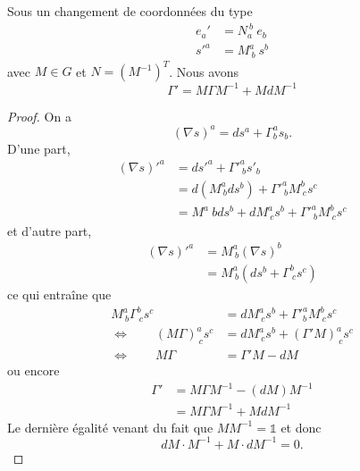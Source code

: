 \documentclass[a4paper,11pt]{report}
\begin{document}
            \begin{prop}\begin{leftbar}
                Sous un changement de coordonnées du type
                \begin{align}
                    e_a' &= N_a^{~b}~e_b \\
                    s'^a &= M^a_{~b} ~s^b
                \end{align}
                 avec $M\in G$ et $N = (M^{-1})^T$. Nous avons
                 \begin{equation}
                     \Gamma' = M\Gamma M^{-1} + MdM^{-1}
                 \end{equation}
            \end{leftbar}\end{prop}
        
            \begin{proof}
                On a 
                \begin{equation}
                    (\nabla s)^a = ds^a + \Gamma^a_b s_b.
                \end{equation}
                D'une part, 
                \begin{align}
                    (\nabla s)'^a &= ds'^a +  \Gamma'^a_{~b} s'_b \\
                    &= d(M^a_{~b} ds^b) + \Gamma'^a_{~b} M^b_{~c}s^c \\
                    &= M^a{~b}ds^b + dM^a_{~c}s^b + \Gamma'^a_{~b} M^b_{~c}s^c
                \end{align}
                et d'autre part,
                \begin{align}
                    (\nabla s)'^a &= M^a_{~b}(\nabla s)^b \\
                    &=  M^a_{~b}\left( ds^b+\Gamma^b_{~c}s^c \right)
                \end{align}
                ce qui entraîne que
                \begin{align}
                     M^a_{~b}\Gamma^b_{~c}s^c &=  dM^a_{~c}s^b + \Gamma'^a_b M^b_{~c}s^c\\
                     \Leftrightarrow \qquad (M\Gamma)^a_{~c}s^c &= dM^a_{~c}s^b + (\Gamma'M)^a_{~c}s^c\\ 
                     \Leftrightarrow \qquad M\Gamma &= \Gamma'M - dM
                \end{align}
                ou encore
                \begin{align}
                    \Gamma' &= M\Gamma M^{-1}-(dM)M^{-1}\\
                    &= M\Gamma M^{-1} + MdM^{-1}
                \end{align}
                Le dernière égalité venant du fait que $MM^{-1} = \mathbb{1}$ et donc 
                \begin{equation}
                    dM\cdot M^{-1} + M\cdot dM^{-1} = 0.
                \end{equation}
            \end{proof}
        
\end{document}
